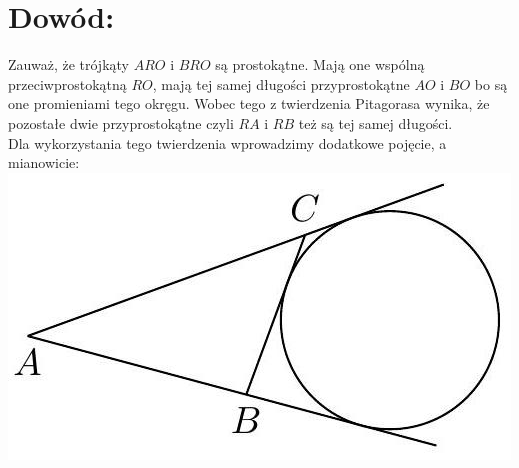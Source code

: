 \documentclass[10pt]{article}
\begin{document}
\section*{Dowód:}
Zauważ, że trójkąty \(A R O\) i \(B R O\) są prostokątne. Mają one wspólną przeciwprostokątną \(R O\), mają tej samej długości przyprostokątne \(A O\) i \(B O\) bo są one promieniami tego okręgu. Wobec tego z twierdzenia Pitagorasa wynika, że pozostałe dwie przyprostokątne czyli \(R A\) i \(R B\) też są tej samej długości.\\
Dla wykorzystania tego twierdzenia wprowadzimy dodatkowe pojęcie, a mianowicie:\\
\includegraphics[max width=\textwidth, center]{2024_11_21_e9b4faa005d5be2cc318g-040(1)}
\end{document}
